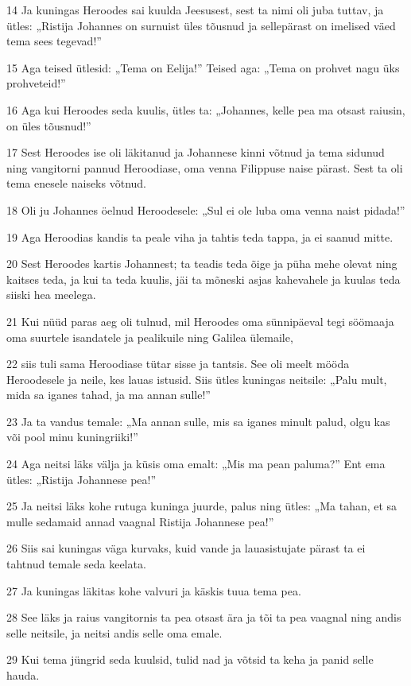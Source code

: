 \par 14 Ja kuningas Heroodes sai kuulda Jeesusest, sest ta nimi oli juba tuttav, ja ütles: „Ristija Johannes on surnuist üles tõusnud ja sellepärast on imelised väed tema sees tegevad!”
\par 15 Aga teised ütlesid: „Tema on Eelija!” Teised aga: „Tema on prohvet nagu üks prohveteid!”
\par 16 Aga kui Heroodes seda kuulis, ütles ta: „Johannes, kelle pea ma otsast raiusin, on üles tõusnud!”
\par 17 Sest Heroodes ise oli läkitanud ja Johannese kinni võtnud ja tema sidunud ning vangitorni pannud Heroodiase, oma venna Filippuse naise pärast. Sest ta oli tema enesele naiseks võtnud.
\par 18 Oli ju Johannes öelnud Heroodesele: „Sul ei ole luba oma venna naist pidada!”
\par 19 Aga Heroodias kandis ta peale viha ja tahtis teda tappa, ja ei saanud mitte.
\par 20 Sest Heroodes kartis Johannest; ta teadis teda õige ja püha mehe olevat ning kaitses teda, ja kui ta teda kuulis, jäi ta mõneski asjas kahevahele ja kuulas teda siiski hea meelega.
\par 21 Kui nüüd paras aeg oli tulnud, mil Heroodes oma sünnipäeval tegi söömaaja oma suurtele isandatele ja pealikuile ning Galilea ülemaile,
\par 22 siis tuli sama Heroodiase tütar sisse ja tantsis. See oli meelt mööda Heroodesele ja neile, kes lauas istusid. Siis ütles kuningas neitsile: „Palu mult, mida sa iganes tahad, ja ma annan sulle!”
\par 23 Ja ta vandus temale: „Ma annan sulle, mis sa iganes minult palud, olgu kas või pool minu kuningriiki!”
\par 24 Aga neitsi läks välja ja küsis oma emalt: „Mis ma pean paluma?” Ent ema ütles: „Ristija Johannese pea!”
\par 25 Ja neitsi läks kohe rutuga kuninga juurde, palus ning ütles: „Ma tahan, et sa mulle sedamaid annad vaagnal Ristija Johannese pea!”
\par 26 Siis sai kuningas väga kurvaks, kuid vande ja lauasistujate pärast ta ei tahtnud temale seda keelata.
\par 27 Ja kuningas läkitas kohe valvuri ja käskis tuua tema pea.
\par 28 See läks ja raius vangitornis ta pea otsast ära ja tõi ta pea vaagnal ning andis selle neitsile, ja neitsi andis selle oma emale.
\par 29 Kui tema jüngrid seda kuulsid, tulid nad ja võtsid ta keha ja panid selle hauda.

